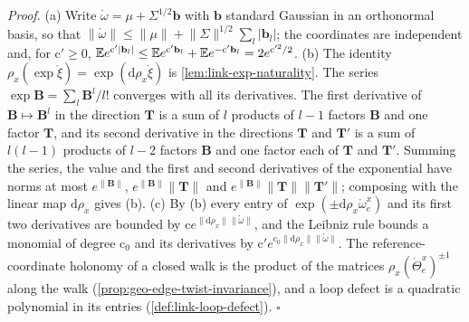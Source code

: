 \noindent\emph{Proof.}
(a) Write $\mathring\omega=\mu+\Sigma^{1/2}\mathbf b$ with $\mathbf b$ standard Gaussian in an orthonormal
basis, so that $\lVert\mathring\omega\rVert\leq\lVert\mu\rVert+\lVert\Sigma\rVert^{1/2}\sum_l\lvert\mathbf b_l\rvert$;
the coordinates are independent and, for $\mathrm c'\geq0$,
$\mathbb E e^{\mathrm c'\lvert\mathbf b_l\rvert}\leq\mathbb E e^{\mathrm c'\mathbf b_l}+\mathbb E e^{-\mathrm c'\mathbf b_l}=2e^{\mathrm c'^2/2}$.
(b) The identity $\rho_x(\exp\mathring\xi)=\exp(\mathrm d\rho_x\mathring\xi)$ is
\cref{lem:link-exp-naturality}. The series $\exp\mathbf B=\sum_l\mathbf B^l/l!$ converges
with all its derivatives. The first derivative of $\mathbf B\mapsto\mathbf B^l$ in the direction $\mathbf T$ is a
sum of $l$ products of $l-1$ factors $\mathbf B$ and one factor $\mathbf T$, and its second derivative in the
directions $\mathbf T$ and $\mathbf T'$ is a sum of $l(l-1)$ products of $l-2$ factors $\mathbf B$ and one factor
each of $\mathbf T$ and $\mathbf T'$. Summing the series, the value and the first and second derivatives of the
exponential have norms at most $e^{\lVert\mathbf B\rVert}$, $e^{\lVert\mathbf B\rVert}\lVert\mathbf T\rVert$ and
$e^{\lVert\mathbf B\rVert}\lVert\mathbf T\rVert\lVert\mathbf T'\rVert$; composing with the linear map $\mathrm d\rho_x$
gives (b). (c) By (b) every entry of
$\exp(\pm\mathrm d\rho_x\mathring\omega^x_e)$ and its first two derivatives are bounded by
$\mathrm c e^{\lVert\mathrm d\rho_x\rVert\lVert\mathring\omega\rVert}$, and the Leibniz rule bounds a monomial of
degree $\mathrm c_0$ and its derivatives by $\mathrm c'e^{\mathrm c_0\lVert\mathrm d\rho_x\rVert\lVert\mathring\omega\rVert}$. The
reference-coordinate holonomy of a closed walk is the product of the matrices
$\rho_x(\mathring\Theta^x_e)^{\pm1}$ along the walk (\cref{prop:geo-edge-twist-invariance}), and a loop
defect is a quadratic polynomial in its entries (\cref{def:link-loop-defect}). \hfill$\square$

